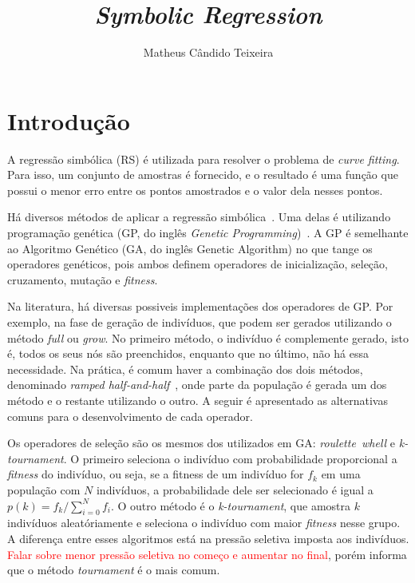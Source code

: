 \documentclass[a4paper]{paper}
\begin{document}
\title{{\itshape Symbolic Regression}}
\author{Matheus Cândido Teixeira}
\maketitle

\section{Introdução}
A regressão simbólica (RS) é utilizada para resolver o problema de \emph{curve
fitting}. Para isso, um conjunto de amostras é fornecido, e o resultado é uma
função que possui o menor erro entre os pontos amostrados e o valor dela nesses
pontos.

Há diversos métodos de aplicar a regressão simbólica~\citep{jin2019}. Uma delas
é utilizando programação genética (GP, do inglês \textit{Genetic
  Programming})~\citep{poli2008}.  A GP é semelhante ao Algoritmo Genético (GA,
do inglês Genetic Algorithm) no que tange os operadores genéticos, pois ambos
definem operadores de inicialização, seleção, cruzamento, mutação e
\textit{fitness}.

Na literatura, há diversas possiveis implementações dos operadores de GP. Por
exemplo, na fase de geração de indivíduos, que podem ser gerados utilizando o
método \textit{full} ou \textit{grow}. No primeiro método, o indivíduo é
complemente gerado, isto é, todos os seus nós são preenchidos, enquanto que no
último, não há essa necessidade. Na prática, é comum haver a combinação dos dois
métodos, denominado \textit{ramped half-and-half}~\citep{poli2008}, onde parte
da população é gerada um dos método e o restante utilizando o outro. A seguir é
apresentado as alternativas comuns para o desenvolvimento de cada operador.

Os operadores de seleção são os mesmos dos utilizados em GA:
\textit{roulette~whell} e \textit{k-tournament}. O primeiro seleciona o
indivíduo com probabilidade proporcional a \textit{fitness} do indivíduo, ou
seja, se a fitness de um indivíduo for \emph{$f_k$} em uma população com $N$
indivíduos, a probabilidade dele ser selecionado é igual a $p(k) =
f_k/\sum_{i=0}^{N}f_i$. O outro método é o \textit{k-tournament}, que amostra
$k$ indivíduos aleatóriamente e seleciona o indivíduo com maior \textit{fitness}
nesse grupo. A diferença entre esses algoritmos está na pressão seletiva imposta
aos indivíduos. \textcolor{red}{Falar sobre menor pressão seletiva no começo e
  aumentar no final}, porém \citet{poli2008} informa que o método
\textit{tournament} é o mais comum.
\end{document}
